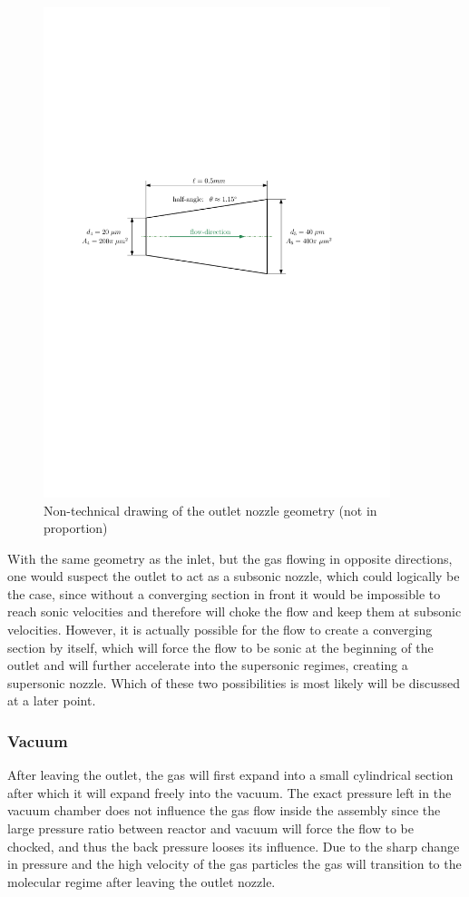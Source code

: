 	\begin{figure}[H]
	    \centering
	    \includegraphics[width=0.9\textwidth]{src/03_analytical-work/fig_outlet-nozzle-geometry.pdf}
	    \caption{Non-technical drawing of the outlet nozzle geometry (not in proportion)}
	    \label{fig:geometry-outlet-nozzle}
	\end{figure}
	With the same geometry as the inlet, but the gas flowing in opposite directions, one would suspect the outlet to act as a subsonic nozzle, which could logically be the case, since without a converging section in front it would be impossible to reach sonic velocities and therefore will choke the flow and keep them at subsonic velocities.
	However, it is actually possible for the flow to create a converging section by itself, which will force the flow to be sonic at the beginning of the outlet and will further accelerate into the supersonic regimes, creating a supersonic nozzle.
	Which of these two possibilities is most likely will be discussed at a later point.
	
\subsubsection*{Vacuum}

	After leaving the outlet, the gas will first expand into a small cylindrical section after which it will expand freely into the vacuum.
	The exact pressure left in the vacuum chamber does not influence the gas flow inside the assembly since the large pressure ratio between reactor and vacuum will force the flow to be chocked, and thus the back pressure looses its influence.
	Due to the sharp change in pressure and the high velocity of the gas particles the gas will transition to the molecular regime after leaving the outlet nozzle.

